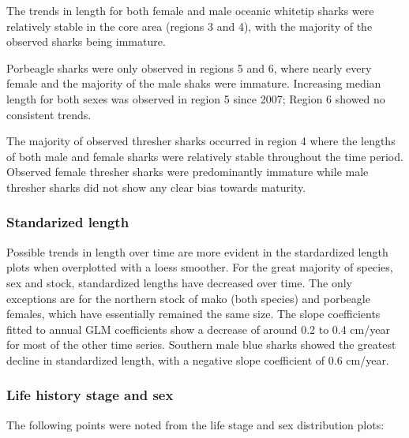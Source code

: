 \documentclass[12pt]{SCreport}
\begin{document}
The trends in length for both female and male oceanic whitetip sharks were relatively stable in the core area (regions 3 and 4), with the majority of the observed sharks being immature.  

Porbeagle sharks were only observed in regions 5 and 6, where nearly every female and the majority of the male shaks were immature.  Increasing median length for both sexes was observed in region 5 since 2007; Region 6 showed no consistent trends.

The majority of observed thresher sharks occurred in region 4 where the lengths of both male and female sharks were relatively stable throughout the time period. Observed female thresher sharks were predominantly immature while male thresher sharks did not show any clear bias towards maturity.

\subsubsection{Standarized length}
Possible trends in length over time are more evident in the stardardized length plots when overplotted with a loess smoother.  For the great majority of species, sex and stock, standardized lengths have decreased over time.  The only exceptions are for the northern stock of mako (both species) and porbeagle females, which have essentially remained the same size.  The slope coefficients fitted to annual GLM coefficients show a decrease of around 0.2 to 0.4 cm/year for most of the other time series.  Southern male blue sharks showed the greatest decline in standardized length, with a negative slope coefficient of 0.6 cm/year.

\subsubsection{Life history stage and sex}
The following points were noted from the life stage and sex distribution plots:
\end{document}
